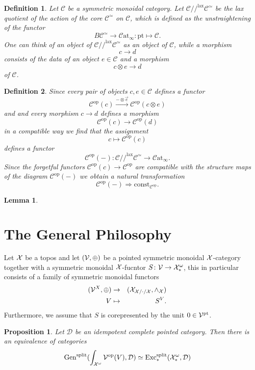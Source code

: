 \documentclass{article}
\newcommand{\xto}{\xrightarrow}
\newcommand{\cC}{\mathcal{C}}
\newcommand{\cD}{\mathcal{D}}
\newcommand{\pt}{\mathrm{pt}}
\newcommand{\op}{\mathrm{op}}
\newcommand{\catinfty}{\mathcal{C}\mathrm{at}_{\infty}}
\newtheorem{proposition}{Proposition}
\newtheorem{lemma}{Lemma}
\newtheorem{definition}{Definition}
\begin{document}
\begin{definition}
Let $\cC$ be a symmetric monoidal category. Let $\cC //^\mathrm{lax} \cC^\simeq$ be the lax 
quotient of the action of the core $\cC^\simeq$ on $\cC$, which is defined as the unstraightening of the 
functor 
\[
B\cC^\simeq \to \catinfty \colon \pt \mapsto \cC.
\]
One can think of an object of $\cC //^\mathrm{lax} \cC^\simeq$ as an object of $\cC$, while a morphism 
\[
  c \to d  
\]
consists of the data of an object $e \in \cC$ and a morphism 
\[
  c \otimes e \to d  
\]
of $\cC$.
\end{definition}
\begin{definition}
Since every pair of objects $c,e \in \cC$ defines a functor 
\[
  \cC^\op(c) \xto{-\otimes \overrightarrow{e}} \cC^\op(c \otimes e)  
\]
and and every morphism $c \to d$ defines a morphism 
\[
  \cC^\op(c) \to \cC^\op(d)  
\]
in a compatible way we find that the assignment
\[
    c \mapsto \cC^\op(c)
\]
defines a functor 
\[
 \cC^\op(-) \colon \cC //^\mathrm{lax} \cC^\simeq \to \catinfty. 
\]
Since the forgetful functors $\cC^\op(c) \to \cC^\op$ are compatible with the structure maps of the diagram $\cC^\op(-)$ we obtain 
a natural transformation 
\[\cC^\op(-) \Rightarrow \mathrm{const_{\cC^\op}}.\]
\end{definition}

\begin{lemma}

\end{lemma}


\section{The General Philosophy}

Let $\cal X$ be a topos and let $(\cal V, \oplus)$ be a pointed symmetric monoidal $\cal X$-category together with a 
symmetric monoidal $\cal X$-fucntor $S \colon \cal V \to \cal X^\omega_*$, this in particular consists 
of a family of symmetric monoidal functors 
\begin{eqnarray*}
({\cal V}^X,\oplus) &\to& (\cal X_{X/\cdot /X}, \wedge_X)    \\
V & \mapsto & S^V.
\end{eqnarray*}
Furthermore, we assume that $S$ is corepresented by the 
unit $0 \in \cal V^\pt$.

\begin{proposition}
Let $\cD$ be an idempotent complete pointed category. Then there is 
an equivalence of categories 
\[
  \mathrm{Gen}^\mathrm{split}(\int_{\cal X^\omega} {\cal V}^{\op}(V), \cD) \simeq \mathrm{Exc}_*^\mathrm{split}(\cal X_*^\omega, \cD)  
\]
\end{proposition}
\end{document}
